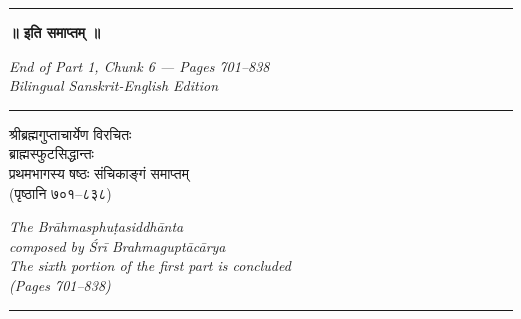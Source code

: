 \documentclass[11pt,a4paper]{article}
\newcommand{\longline}{\noindent\rule{\textwidth}{0.4pt}}
\newcommand{\dev}[1]{{\devanagarifont #1}}
\newenvironment{paracol}[1]{\begingroup}{\endgroup}
\newenvironment{leftcolumn*}{\begingroup}{\endgroup}
\newenvironment{rightcolumn}{\begingroup}{\endgroup}
\begin{document}
\begin{paracol}{2}
\vspace{1cm}
\begin{center}
\longline

\textbf{\Large\dev{॥ इति समाप्तम् ॥}}

\vspace{0.5cm}
\textit{End of Part 1, Chunk 6 --- Pages 701--838}\\[0.3cm]
\textit{Bilingual Sanskrit-English Edition}

\vspace{0.3cm}
\longline

\vspace{0.5cm}
\begin{paracol}{2}
\begin{leftcolumn*}
\begin{center}
\dev{श्रीब्रह्मगुप्ताचार्येण विरचितः}\\
\dev{ब्राह्मस्फुटसिद्धान्तः}\\[0.3cm]
\dev{प्रथमभागस्य षष्ठः संचिकाङ्गं समाप्तम्}\\
\dev{(पृष्ठानि ७०१--८३८)}
\end{center}
\end{leftcolumn*}
\begin{rightcolumn}
\begin{center}
\textit{The Brāhmasphuṭasiddhānta}\\
\textit{composed by Śrī Brahmaguptācārya}\\[0.3cm]
\textit{The sixth portion of the first part is concluded}\\
\textit{(Pages 701--838)}
\end{center}
\end{rightcolumn}
\end{paracol}

\vspace{0.5cm}
\longline
\end{center}
\end{document}
